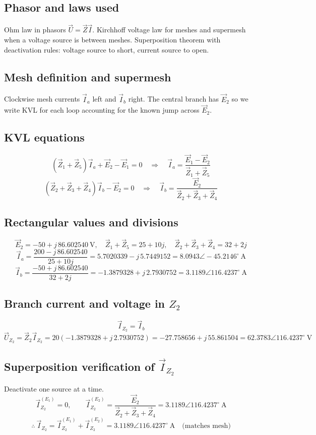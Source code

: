 \documentclass[a4paper,12pt]{article}
\begin{document}
\subsection*{Phasor and laws used}
Ohm law in phasors \( \vec U=\vec Z\vec I \).
Kirchhoff voltage law for meshes and supermesh when a voltage source is between meshes.
Superposition theorem with deactivation rules: voltage source to short, current source to open.

\subsection*{Mesh definition and supermesh}
Clockwise mesh currents \( \vec I_a \) left and \( \vec I_b \) right.
The central branch has \( \vec E_2 \) so we write KVL for each loop accounting for the known jump across \( \vec E_2 \).

\subsection*{KVL equations}
\[
(\vec Z_1+\vec Z_5)\vec I_a + \vec E_2 - \vec E_1 = 0
\quad\Rightarrow\quad
\boxed{\vec I_a = \dfrac{\vec E_1 - \vec E_2}{\vec Z_1+\vec Z_5}}
\]
\[
(\vec Z_2+\vec Z_3+\vec Z_4)\vec I_b - \vec E_2 = 0
\quad\Rightarrow\quad
\boxed{\vec I_b = \dfrac{\vec E_2}{\vec Z_2+\vec Z_3+\vec Z_4}}
\]

\subsection*{Rectangular values and divisions}
\[
\vec E_2 = -50 + j\,86.602540~\text{V},\quad
\vec Z_1+\vec Z_5 = 25+10j,\quad
\vec Z_2+\vec Z_3+\vec Z_4 = 32+2j
\]
\[
\vec I_a = \frac{200 - j\,86.602540}{25+10j}
= 5.7020339 - j\,5.7449152
= \boxed{8.0943\angle -45.2146^\circ~\text{A}}
\]
\[
\vec I_b = \frac{-50 + j\,86.602540}{32+2j}
= -1.3879328 + j\,2.7930752
= \boxed{3.1189\angle 116.4237^\circ~\text{A}}
\]

\subsection*{Branch current and voltage in \(Z_2\)}
\[
\boxed{\vec I_{Z_2}=\vec I_b}
\]
\[
\vec U_{Z_2} = \vec Z_2 \vec I_{Z_2}
= 20(-1.3879328 + j\,2.7930752)
= -27.758656 + j\,55.861504
= \boxed{62.3783\angle 116.4237^\circ~\text{V}}
\]

\subsection*{Superposition verification of \( \vec I_{Z_2} \)}
Deactivate one source at a time.
\[
\vec I_{Z_2}^{(E_1)}=0
,\qquad
\vec I_{Z_2}^{(E_2)}=\dfrac{\vec E_2}{\vec Z_2+\vec Z_3+\vec Z_4}
= 3.1189\angle 116.4237^\circ~\text{A}
\]
\[
\therefore\ \vec I_{Z_2}=\vec I_{Z_2}^{(E_1)}+\vec I_{Z_2}^{(E_2)}
= 3.1189\angle 116.4237^\circ~\text{A} \quad \text{(matches mesh)}
\]
\end{document}
